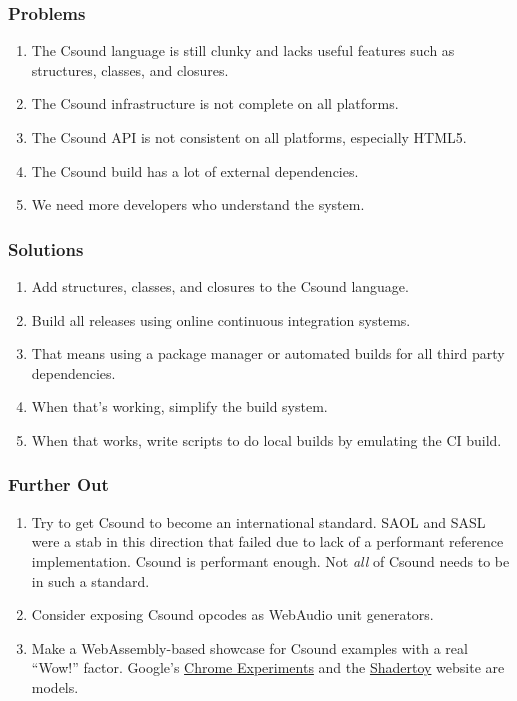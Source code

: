 \documentclass{beamer}
\begin{document}
\begin{frame}[allowframebreaks]
    \frametitle<presentation>{Problems}
    \begin{enumerate}
        \item     
            The Csound language is still clunky and lacks useful features such 
as structures, classes, and closures.
        \item
            The Csound infrastructure is not complete on all platforms.
        \item
            The Csound API is not consistent on all platforms, especially 
HTML5.
        \item
            The Csound build has a lot of external dependencies.
        \item
            We need more developers who understand the system.
    \end{enumerate}    
\end{frame}

\begin{frame}[allowframebreaks]
    \frametitle<presentation>{Solutions}
    \begin{enumerate}
        \item     
            Add structures, classes, and closures to the Csound language.
        \item
            Build all releases using online continuous integration systems.
        \item
            That means using a package manager or automated builds for all 
third party dependencies.
        \item
            When that's working, simplify the build system.
        \item
            When that works, write scripts to do local builds by emulating the 
CI build.
    \end{enumerate}    
\end{frame}

\begin{frame}[allowframebreaks]
    \frametitle<presentation>{Further Out}
    \begin{enumerate}
        \item     
            Try to get Csound to become an international standard. SAOL and 
SASL were a stab in this direction that failed due to lack of a performant 
reference implementation. Csound is performant enough. Not \textit{all} of 
Csound needs to be in such a standard.
        \item
            Consider exposing Csound opcodes as WebAudio unit generators.
        \item 
            Make a WebAssembly-based showcase for Csound examples with a 
real ``Wow!'' factor. Google's 
\href{https://experiments.withgoogle.com/chrome}{Chrome Experiments} and the 
\href{https://www.shadertoy.com/}{Shadertoy} website are models.
    \end{enumerate}    
\end{frame}
\end{document}
